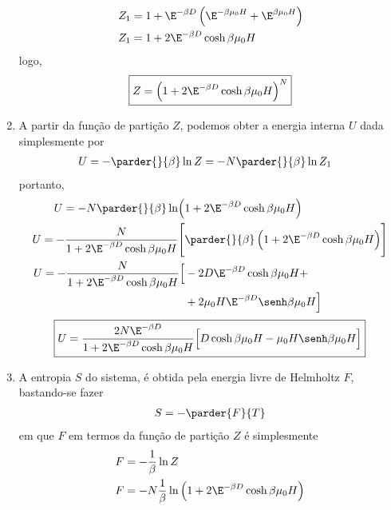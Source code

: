 \begin{prob}
\begin{sol}
\begin{enumerate}[label=\alph *)]
\begin{align}
\begin{split}
          Z_1&=1+\E^{-\beta D}\left(\E^{-\beta\mu_0H}+\E^{\beta\mu_0H}\right)\\
          Z_1&=1+2\E^{-\beta D}\cosh\beta\mu_0H       
        \end{split}
      \end{align}
      logo,
      \begin{align}
        \boxed{
            Z=\left(1+2\E^{-\beta D}\cosh\beta\mu_0H \right)^N
          }
      \end{align}
      \item A partir da função de partição $Z$, podemos obter a energia interna $U$ dada simplesmente por
      \begin{align}
        U&=-\parder{}{\beta}\ln Z=-N\parder{}{\beta}\ln Z_1
      \end{align}
      portanto,
      \begin{align}
        \begin{split}
          U=-N\parder{}{\beta}\ln\Bigl(&1+2\E^{-\beta D}\cosh\beta\mu_0H\Bigr)\\
          U=-\frac{N}{1+2\E^{-\beta D}\cosh\beta\mu_0H}\Biggl[&\parder{}{\beta}\left(1+2\E^{-\beta D}\cosh\beta\mu_0H\right)\Biggr]\\
          U=-\frac{N}{1+2\E^{-\beta D}\cosh\beta\mu_0H}\Bigl[&-2D\E^{-\beta D}\cosh\beta\mu_0H+\\
          &+2\mu_0H\E^{-\beta D}\senh\beta\mu_0H\Bigr]          
        \end{split}
      \end{align}
      \begin{align}
        \boxed{
          U=\frac{2N\E^{-\beta D}}{1+2\E^{-\beta D}\cosh\beta\mu_0H}\Bigl[D\cosh\beta\mu_0H-\mu_0H\senh\beta\mu_0H\Bigr]
        }
      \end{align}
      \item A entropia $S$ do sistema, é obtida pela energia livre de Helmholtz $F$, bastando-se fazer 
      \begin{align}
        S=-\parder{F}{T}
      \end{align}
      em que $F$ em termos da função de partição $Z$ é simplesmente
      \begin{align}
        \begin{split}
          F&=-\frac{1}{\beta}\ln Z\\
          F&=-N\frac{1}{\beta}\ln\left(1+2\E^{-\beta D}\cosh\beta\mu_0H\right)\\          
        \end{split}

\end{align}
\end{enumerate}
\end{sol}
\end{prob}
